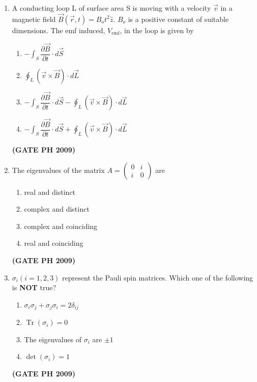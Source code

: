 \documentclass[14pt, a4paper]{extarticle}
\begin{document}
\begin{enumerate}[label=\textbf{Q. \arabic*}]
\item A conducting loop L of surface area S is moving with a velocity $\vec{v}$ in a magnetic field $\vec{B}(\vec{r}, t) = B_o t^2 \hat{z}$.
$B_o$ is a positive constant of suitable dimensions. The emf induced, $V_{\text{emf}}$, in the loop is given by
\begin{multicols}{2}
\begin{enumerate}
\item $-\int_S \dfrac{\partial\vec{B}}{\partial t} \cdot d\vec{S}$
\item $\oint_L (\vec{v} \times \vec{B}) \cdot d\vec{L}$
\item $-\int_S \dfrac{\partial\vec{B}}{\partial t} \cdot d\vec{S} - \oint_L (\vec{v} \times \vec{B}) \cdot d\vec{L}$
\item $-\int_S \dfrac{\partial\vec{B}}{\partial t} \cdot d\vec{S} + \oint_L (\vec{v} \times \vec{B}) \cdot d\vec{L}$
\end{enumerate}
\end{multicols}
\hfill \textbf{(GATE PH 2009)}

\item The eigenvalues of the matrix $A = \begin{pmatrix} 0 & i \\ i & 0 \end{pmatrix}$ are
    \begin{multicols}{2}
    \begin{enumerate}
        \item real and distinct
        \item complex and distinct
        \item complex and coinciding
        \item real and coinciding
    \end{enumerate}
    \end{multicols}
    \hfill \textbf{(GATE PH 2009)}
    

\item $\sigma_i (i=1, 2, 3)$ represent the Pauli spin matrices. Which one of the following is \textbf{NOT} true?
    \begin{multicols}{2}
    \begin{enumerate}
        \item $\sigma_i \sigma_j + \sigma_j \sigma_i = 2\delta_{ij}$
        \item $\operatorname{Tr}(\sigma_i) = 0$
        \item The eigenvalues of $\sigma_i$ are $\pm 1$
        \item $\det(\sigma_i) = 1$
    \end{enumerate}
    \end{multicols}
    \hfill \textbf{(GATE PH 2009)}


\end{enumerate}
\end{document}
